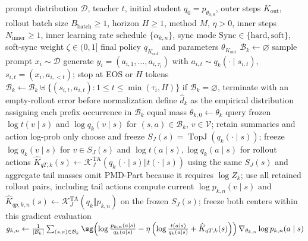 \begin{algorithm}[ht]
\caption{Tail-aware OPD outer--inner optimization\\{\small\textit{Semantics: 冻结 outer rollout，以 Tail-aware KL 中心运行 Mean、BPO 或 MDPO，再同步并重新 rollout}}}
\begin{algorithmic}[1]
\Require prompt distribution $\mathcal D$, teacher $t$, initial student $q_0=p_{\theta_{0,0}}$, outer steps $K_{\mathrm{out}}$, rollout batch size $B_{\mathrm{batch}}\ge1$, horizon $H\ge1$, method $M$, $\eta>0$, inner steps $N_{\mathrm{inner}}\ge1$, inner learning rate schedule $\{\alpha_{k,n}\}$, sync mode $\mathrm{Sync}\in\{\mathrm{hard},\mathrm{soft}\}$, soft-sync weight $\zeta\in(0,1]$
\Ensure final policy $q_{K_{\mathrm{out}}}$ and parameters $\theta_{K_{\mathrm{out}}}$
    \State $\mathcal B_k\gets\varnothing$ 
        \State sample prompt $x_i\sim\mathcal D$
        \State generate $y_i=(a_{i,1},\ldots,a_{i,\tau_i})$ with $a_{i,t}\sim q_k(\cdot\mid s_{i,t})$, $s_{i,t}=(x_i,a_{i,<t})$; stop at EOS or $H$ tokens
        \State $\mathcal B_k\gets\mathcal B_k\mathbin{\uplus}\{(s_{i,t},a_{i,t}):1\le t\le\min(\tau_i,H)\}$
    \EndFor
    \State if $\mathcal B_k=\varnothing$, terminate with an empty-rollout error before normalization
    \State define $\widehat d_k$ as the empirical distribution assigning each prefix occurrence in $\mathcal B_k$ equal mass
    \State $\theta_{k,0}\gets\theta_k$ 
    \State query frozen $\log t(v\mid s)$ and $\log q_k(v\mid s)$ for $(s,a)\in\mathcal B_k$, $v\in\mathcal V$; retain summaries and action log-prob only
    \State choose and freeze $S_J(s)=\operatorname{TopJ}(q_k(\cdot\mid s))$; freeze $\log q_k(v\mid s)$ for $v\in S_J(s)$ and $\log t(a\mid s),\log q_k(a\mid s)$ for rollout actions
    \State $\widehat K_{qT,k}(s)\gets\mathcal K_J^{\mathrm{TA}}(q_k(\cdot\mid s)\Vert t(\cdot\mid s))$ using the same $S_J(s)$ and aggregate tail masses
    \State omit PMD-Part because it requires $\log Z_k$; use all retained rollout pairs, including tail actions
        \State compute current $\log p_{k,n}(v\mid s)$ and $\widehat K_{qp,k,n}(s)\gets\mathcal K_J^{\mathrm{TA}}(q_k\Vert p_{k,n})$ on the frozen $S_J(s)$; freeze both centers within this gradient evaluation
            \State $g_{k,n}\gets\frac1{|\mathcal B_k|}\sum_{(s,a)\in\mathcal B_k}\sg\!\left(\log\frac{p_{k,n}(a\mid s)}{q_k(a\mid s)}-\eta\left(\log\frac{t(a\mid s)}{q_k(a\mid s)}+\widehat K_{qT,k}(s)\right)\right)\nabla_{\theta_{k,n}}\log p_{k,n}(a\mid s)$

\end{algorithmic}
\end{algorithm}
